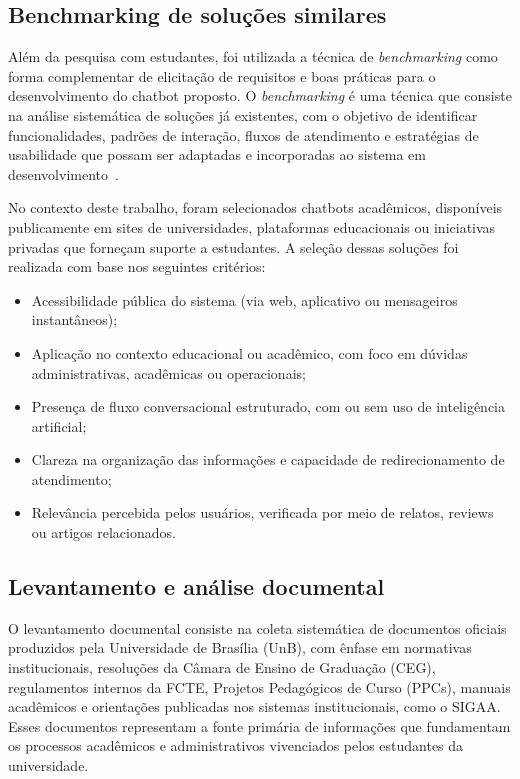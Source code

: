 \subsection{Benchmarking de soluções similares}

Além da pesquisa com estudantes, foi utilizada a técnica de \textit{benchmarking} como forma complementar de elicitação de requisitos e boas práticas para o desenvolvimento do chatbot proposto. O \textit{benchmarking} é uma técnica que consiste na análise sistemática de soluções já existentes, com o objetivo de identificar funcionalidades, padrões de interação, fluxos de atendimento e estratégias de usabilidade que possam ser adaptadas e incorporadas ao sistema em desenvolvimento~\cite{pressman2016engenharia, sommerville2011}.

No contexto deste trabalho, foram selecionados chatbots acadêmicos, disponíveis publicamente em sites de universidades, plataformas educacionais ou iniciativas privadas que forneçam suporte a estudantes. A seleção dessas soluções foi realizada com base nos seguintes critérios:

\begin{itemize}
    \item Acessibilidade pública do sistema (via web, aplicativo ou mensageiros instantâneos);
    \item Aplicação no contexto educacional ou acadêmico, com foco em dúvidas administrativas, acadêmicas ou operacionais;
    \item Presença de fluxo conversacional estruturado, com ou sem uso de inteligência artificial;
    \item Clareza na organização das informações e capacidade de redirecionamento de atendimento;
    \item Relevância percebida pelos usuários, verificada por meio de relatos, reviews ou artigos relacionados.
\end{itemize}

\subsection{Levantamento e análise documental}

O levantamento documental consiste na coleta sistemática de documentos oficiais produzidos pela Universidade de Brasília (UnB), com ênfase em normativas institucionais, resoluções da Câmara de Ensino de Graduação (CEG), regulamentos internos da FCTE, Projetos Pedagógicos de Curso (PPCs), manuais acadêmicos e orientações publicadas nos sistemas institucionais, como o SIGAA. Esses documentos representam a fonte primária de informações que fundamentam os processos acadêmicos e administrativos vivenciados pelos estudantes da universidade.

